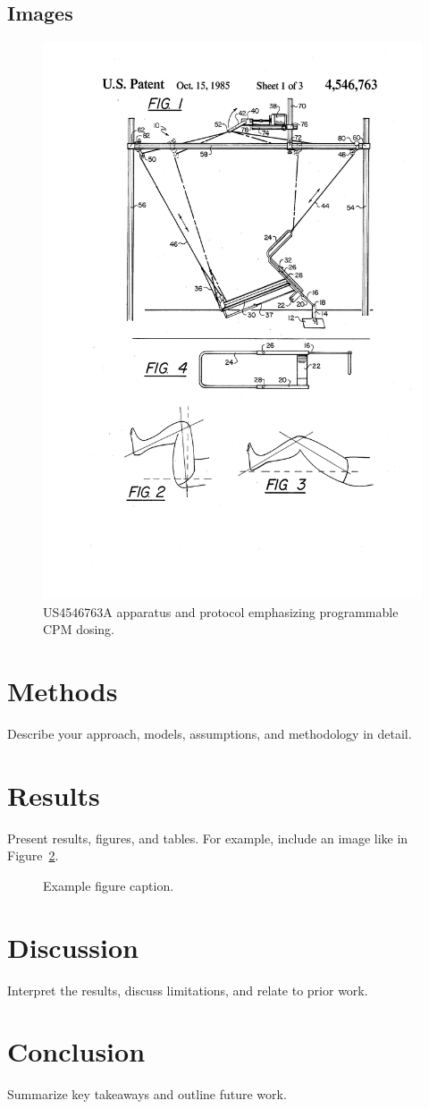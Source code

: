 \documentclass[11pt]{article}
\begin{document}
\subsection{Images}
\begin{figure}[H]
  \centering
  \includegraphics[width=0.54\linewidth]{US4546763-drawings-page-2.png}
  \caption{US4546763A apparatus and protocol emphasizing programmable CPM dosing.}
  \label{fig:US4546763A}
\end{figure}

\section{Methods}
Describe your approach, models, assumptions, and methodology in detail.

\section{Results}
Present results, figures, and tables. For example, include an image like in Figure~\ref{fig:example}.

\begin{figure}[h]
  \centering
  \caption{Example figure caption.}
  \label{fig:example}
\end{figure}

\section{Discussion}
Interpret the results, discuss limitations, and relate to prior work.

\section{Conclusion}
Summarize key takeaways and outline future work.

% 
% 
\end{document}
